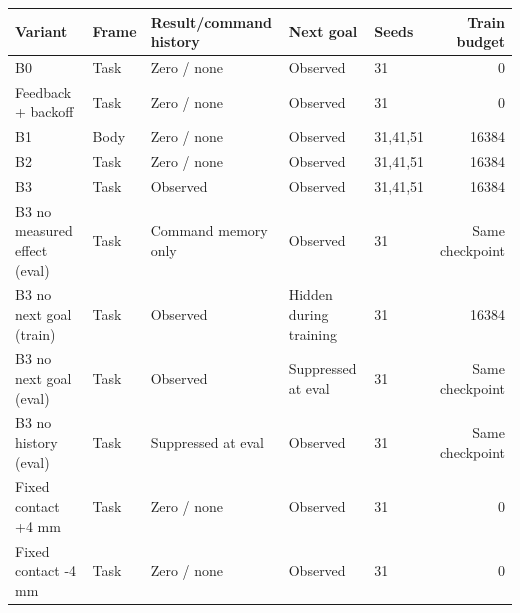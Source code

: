 \begin{tabular}{lllllr}
\toprule
Variant & Frame & Result/command history & Next goal & Seeds & Train budget \\
\midrule
B0 & Task & Zero / none & Observed & 31 & 0 \\
Feedback + backoff & Task & Zero / none & Observed & 31 & 0 \\
B1 & Body & Zero / none & Observed & 31,41,51 & 16384 \\
B2 & Task & Zero / none & Observed & 31,41,51 & 16384 \\
B3 & Task & Observed & Observed & 31,41,51 & 16384 \\
B3 no measured effect (eval) & Task & Command memory only & Observed & 31 & Same checkpoint \\
B3 no next goal (train) & Task & Observed & Hidden during training & 31 & 16384 \\
B3 no next goal (eval) & Task & Observed & Suppressed at eval & 31 & Same checkpoint \\
B3 no history (eval) & Task & Suppressed at eval & Observed & 31 & Same checkpoint \\
Fixed contact +4 mm & Task & Zero / none & Observed & 31 & 0 \\
Fixed contact -4 mm & Task & Zero / none & Observed & 31 & 0 \\
\bottomrule
\end{tabular}
